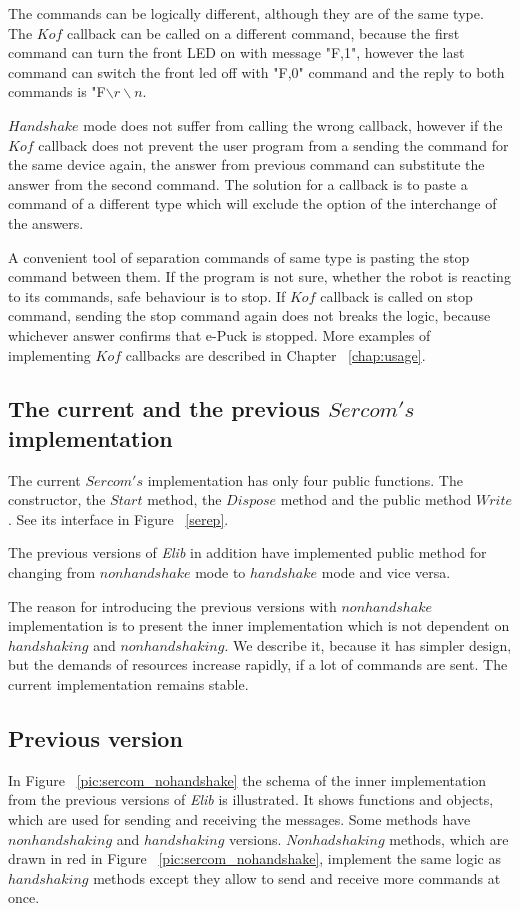 	The commands can be logically different, although they are of the same type.
	The $Kof$ callback can be called on a different command, because the first command can turn the front LED on 
	with message "F,1", however the last command can switch the front led off with "F,0" command and 
	the reply to both commands is "F$\backslash r\backslash n$.

	$Handshake$ mode does not suffer from calling the wrong callback, however if the $Kof$ callback
	does not prevent the user program from a sending the command for the same device again,
	the answer from previous command can substitute the answer from the second command.
	The solution for a callback is to paste a command of a different type which will exclude the option
	of the interchange of the answers.

	A convenient tool of separation commands of same type is pasting the stop command between them.
	If the program is not sure, whether the robot is reacting to its commands, safe behaviour is to stop.
	If $Kof$ callback is called on stop command, sending the stop command again does not breaks the logic,
	because whichever answer confirms that e-Puck is stopped. More examples of implementing $Kof$ callbacks
	are described in Chapter ~\ref{chap:usage}.
\subsection{The current and the previous $Sercom's$ implementation}\label{sec:versions}
	The current $Sercom's$ implementation has only four public functions.
	The constructor, the $Start$ method, the $Dispose$ method and the public method $Write$. 
	See its interface in Figure ~\ref{serep}.	

	The previous versions of {\it Elib} in addition have implemented public method for changing from $nonhandshake$ mode to 
	$handshake$ mode and vice versa.

	The reason for introducing the previous versions with $nonhandshake$ implementation is to present 
	the inner implementation which is not dependent on $handshaking$ and $nonhandshaking$.
	We describe it, because it has simpler design, but the demands of resources increase rapidly, if a lot of commands are sent.
	The current implementation remains stable.
\subsection*{Previous version}\label{previous}
	In  Figure ~\ref{pic:sercom_nohandshake} the schema of the inner implementation 
	from the previous versions of {\it Elib} is illustrated.
	It shows functions and objects, which are used for sending and receiving the messages.
	Some methods have $nonhandshaking$ and $handshaking$ versions.
	$Nonhadshaking$ methods, which are drawn in red	in Figure ~\ref{pic:sercom_nohandshake}, implement the same logic 
	as $handshaking$ methods except they allow to send and receive more commands
	at once.

